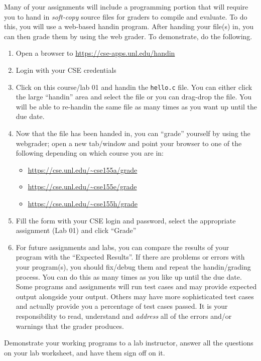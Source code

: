 \documentclass[12pt]{scrartcl}
\begin{document}
Many of your assignments will include a programming portion that will 
require you to hand in \emph{soft-copy} source files for graders to compile 
and evaluate.  To do this, you will use a web-based handin program.  
After handing your file(s) in, you can then grade them by using the
web grader.  To demonstrate, do the following.

\begin{enumerate}
  \item Open a browser to \url{https://cse-apps.unl.edu/handin}
  \item Login with your CSE credentials
  \item Click on this course/lab 01 and handin the \texttt{hello.c} file.  You can
  either click the large ``handin'' area and select the file or you can drag-drop
  the file.  You will be able to re-handin the same file as many times as you want up until
  the due date.
  \item Now that the file has been handed in, you can ``grade'' yourself by using
  the webgrader; open a new tab/window and point your browser to one of the following
  depending on which course you are in:
  \begin{itemize}
    \item \url{https://cse.unl.edu/~cse155a/grade}
    \item \url{https://cse.unl.edu/~cse155e/grade}
    \item \url{https://cse.unl.edu/~cse155h/grade}
  \end{itemize}
  \item Fill the form with your CSE login and password, select the appropriate assignment (Lab 01)
  	and click ``Grade''
  \item For future assignments and labs, you can compare the results of 
  	your program with the ``Expected Results''.  If there are problems or errors with
	your program(s), you should fix/debug them and repeat the handin/grading process.
	You can do this as many times as you like up until the due date.  Some programs 
	and assignments will run test cases and may provide expected output alongside 
	your output.  Others may have more sophisticated test cases and actually provide 
	you a percentage of test cases passed.  It is your responsibility to read, 
	understand and \emph{address} all of the errors and/or warnings that the grader produces.
\end{enumerate}

Demonstrate your working programs to a lab instructor, answer all the 
questions on your lab worksheet, and have them sign off on it.
\end{document}
